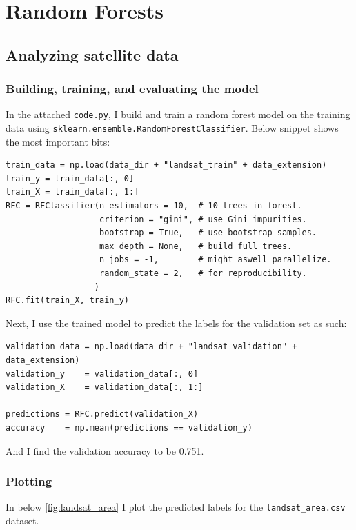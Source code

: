 \section{Random Forests}

\subsection{Analyzing satellite data}

\subsubsection{Building, training, and evaluating the model}

In the attached \texttt{code.py}, I build and train a random forest model on the
training data using \texttt{sklearn.ensemble.RandomForestClassifier}. Below
snippet shows the most important bits:

\begin{verbatim}
train_data = np.load(data_dir + "landsat_train" + data_extension)
train_y = train_data[:, 0]
train_X = train_data[:, 1:]
RFC = RFClassifier(n_estimators = 10,  # 10 trees in forest.
                   criterion = "gini", # use Gini impurities.
                   bootstrap = True,   # use bootstrap samples.
                   max_depth = None,   # build full trees.
                   n_jobs = -1,        # might aswell parallelize.
                   random_state = 2,   # for reproducibility.
                  )
RFC.fit(train_X, train_y)
\end{verbatim}

Next, I use the trained model to predict the labels for the validation set as
such:

\begin{verbatim}
validation_data = np.load(data_dir + "landsat_validation" + data_extension)
validation_y    = validation_data[:, 0]
validation_X    = validation_data[:, 1:]

predictions = RFC.predict(validation_X)
accuracy    = np.mean(predictions == validation_y)
\end{verbatim}

And I find the validation accuracy to be 0.751.

\subsubsection{Plotting}

In below \cref{fig:landsat_area} I plot the predicted labels for the
\texttt{landsat\_area.csv} dataset.

